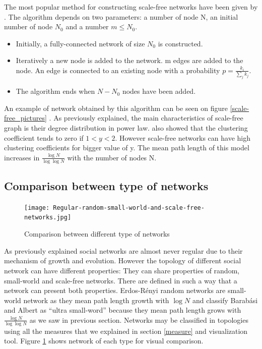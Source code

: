 \documentclass[a4paper, 12pt]{report}
\begin{document}
The most popular method for constructing scale-free networks have been given by \cite{barabasi_model}. The algorithm depends on two parameters: a number of node N, an initial number of node $N_0$ and a number $m \leq N_0$.\\
\begin{itemize}
\item Initially, a fully-connected network of size $N_0$ is constructed.
\item Iteratively a new node is added to the network. m edges are added to the node. An edge is connected to an existing node with a probability $p = \frac{k_i}{\sum_{j} k_j}$.
\item The algorithm ends when $N -N_0$ nodes have been added.
\end{itemize}
An example of network obtained by this algorithm can be seen on figure \ref{scale-free_pictures} . As previously explained, the main characteristics of scale-free graph is their degree distribution in power law. \cite{globalClustering2} also showed that the clustering coefficient tends to zero if $ 1 < y < 2$. However scale-free networks can have high clustering coefficients for bigger value of y. The mean path length of this model increases in $\frac{\log{N}}{\log{\log{N}}}$ with the number of nodes N.\\

\subsection{Comparison between type of networks}

\begin{figure}
\centering
\texttt{[image: Regular-random-small-world-and-scale-free-networks.jpg]}
\caption{Comparison between different type of networks \citep{img_comp}}
\label{comparison_networks}
\end{figure}

As previously explained social networks are almost never regular due to their mechanism of growth and evolution. However the topology of different social network can have different properties: They can share properties of random, small-world and scale-free networks. There are defined in such a way that a network can present both properties. Erdos-Rényi random networks are small-world network as they mean path length growth with $\log N$ and \cite{xs} classify Barabási and Albert as ``ultra small-word'' because they mean path length grows with $\frac{\log{N}}{\log{\log{N}}}$ as we saw in previous section. Networks may be classified in topologies using all the measures that we explained in section \ref{measure} and visualization tool. Figure \ref{comparison_networks} shows network of each type for visual comparison.
\end{document}
